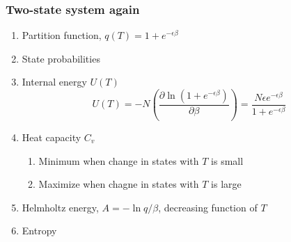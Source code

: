 \documentclass[11pt]{article}
\begin{document}
\subsubsection{Two-state system again}
\label{sec:org76b006f}
\begin{enumerate}
\item Partition function, \(q(T)=1+e^{-\epsilon\beta}\)
\item State probabilities
\item Internal energy \(U(T)\)
\begin{equation}
  U(T)=-N \left ( \frac{\partial \ln(1+e^{-\epsilon\beta})}{\partial\beta}
  \right)=\frac{N\epsilon e^{-\epsilon\beta}}{1+e^{-\epsilon\beta}}
\end{equation}
\item Heat capacity \(C_v\)
\begin{enumerate}
\item Minimum when change in states with \(T\) is small
\item Maximize when chagne in states with \(T\) is large
\end{enumerate}
\item Helmholtz energy, \(A= -\ln q/\beta\), decreasing function of \(T\)
\item Entropy
\end{enumerate}
\end{document}
